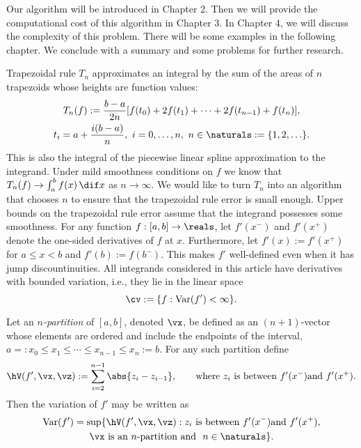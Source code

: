 \documentclass{iitthesis}
\DeclareMathOperator{\Var}{Var}
\begin{document}
Our algorithm will be introduced in Chapter 2. Then we will provide the computational cost of this algorithm in Chapter 3. In Chapter 4, we will discuss the complexity of this problem. There will be some examples in the following chapter. We conclude with a summary and some problems for further research. 



 

Trapezoidal rule $T_n$ approximates an integral by the sum of the areas of $n$ trapezoids whose heights are function values:
\begin{multline} \label{trapruledef}
T_n(f) := \frac{b-a}{2n} [ f(t_0) + 2 f(t_1) + \cdots  + 2 f(t_{n-1}) + f(t_n)], \\
t_i=a+\frac{i(b-a)}{n}, \ i=0, \ldots, n, \ n \in \naturals := \{1, 2, \ldots \}.
\end{multline}
This is also the integral of the piecewise linear spline approximation to the integrand. Under mild smoothness conditions on $f$ we know that $T_n(f) \to \int_a^b f(x) \, \dif x$ as $n \to \infty$. We would like to turn $T_n$ into an algorithm that chooses $n$ to ensure that the trapezoidal rule error is small enough.  
Upper bounds on the trapezoidal rule error assume that the integrand possesses some smoothness.  For any function $f:[a,b]\to \reals$, let $f'(x^{-})$ and $f'(x^{+})$ denote the one-sided derivatives of $f$ at $x$.  Furthermore, let $f'(x):=f'(x^{+})$ for $a \le x < b$ and $f'(b):=f(b^{-})$. This makes $f'$ well-defined even when it has jump discountinuities.  All integrands considered in this article have derivatives with bounded variation, i.e., they lie in the linear space
\[
\cv:=\{f : \Var(f')<\infty \}.
\]

Let an \emph{$n$-partition} of $[a,b]$, denoted $\vx$, be defined as an $(n+1)$-vector whose elements are ordered and include the endpoints of the interval,  $a=:x_0 \le x_1 \le \cdots \le x_{n-1} \le x_{n}:=b$.  For any such partition define
\begin{equation} \label{tVdef}
\hV(f',\vx,\vz) : = \sum_{i=2}^{n-1} \abs{z_{i} - z_{i-1}}, \qquad
\text{where } z_{i} \text{ is between } f'(x^{-}) \text{and } f'(x^{+}).
\end{equation}
Then the variation of $f'$ may be written as 
\begin{multline} \label{vardef}
\Var(f')
= \sup  \{ \hV(f',\vx,\vz) : z_{i} \text{ is between } f'(x^{-}) \text{and } f'(x^{+}),  \\ 
\vx \text{ is an $n$-partition and } \ n \in \naturals \}.
\end{multline}
\end{document}
